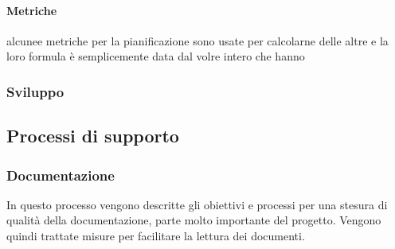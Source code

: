            \paragraph{Metriche}
           alcunee metriche per la pianificazione sono usate per calcolarne delle altre e la loro formula è semplicemente data dal volre intero che hanno
            \def\productquality{
            {   Budget at Completion,
                numero intero, 
                $ \pm 5 \% $ del preventivo,
                pari al preventivo
            },
            {   Earned value,
                BAC - $\%$ di lavoro completato, 
                $ >0$,
                $ >0$
            },
            {   Planned value,
                valore pianificato nel momento del calcolo, 
                $ >0$,
                $ >0$
            },
            {  Acual cost,
               numero intero, 
                0 < AC $\leq$ budget totale,
                0 < AC $\leq$ PV
            },
            {   Schedule variance,
               SV = EV - PV, 
                $ >0$,
                $ 0$
            },
            {    Cost variance,
               CV = EV - AC, 
                $ >0$,
                $ \geq 0$
            },
        }
 


        
    \subsubsection{Sviluppo}
        
        \subsection{Processi di supporto}
            \subsubsection{Documentazione}
            In questo processo vengono descritte gli obiettivi e processi per una stesura di qualità della documentazione, parte molto importante del progetto. Vengono quindi trattate misure per facilitare la lettura dei documenti.
            
